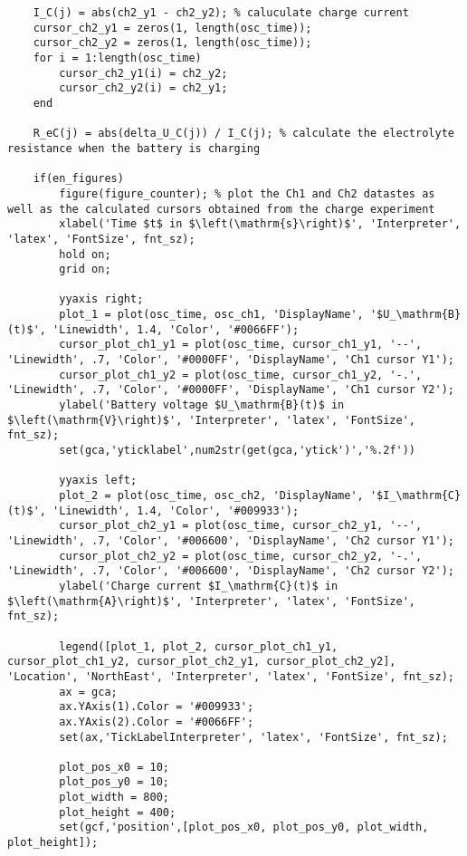 \begin{lstlisting}
    I_C(j) = abs(ch2_y1 - ch2_y2); % caluculate charge current
    cursor_ch2_y1 = zeros(1, length(osc_time));
    cursor_ch2_y2 = zeros(1, length(osc_time));
    for i = 1:length(osc_time)
        cursor_ch2_y1(i) = ch2_y2;
        cursor_ch2_y2(i) = ch2_y1;
    end

    R_eC(j) = abs(delta_U_C(j)) / I_C(j); % calculate the electrolyte resistance when the battery is charging
    
    if(en_figures)
        figure(figure_counter); % plot the Ch1 and Ch2 datastes as well as the calculated cursors obtained from the charge experiment
        xlabel('Time $t$ in $\left(\mathrm{s}\right)$', 'Interpreter', 'latex', 'FontSize', fnt_sz);
        hold on;
        grid on;
        
        yyaxis right;
        plot_1 = plot(osc_time, osc_ch1, 'DisplayName', '$U_\mathrm{B}(t)$', 'Linewidth', 1.4, 'Color', '#0066FF');
        cursor_plot_ch1_y1 = plot(osc_time, cursor_ch1_y1, '--', 'Linewidth', .7, 'Color', '#0000FF', 'DisplayName', 'Ch1 cursor Y1');
        cursor_plot_ch1_y2 = plot(osc_time, cursor_ch1_y2, '-.', 'Linewidth', .7, 'Color', '#0000FF', 'DisplayName', 'Ch1 cursor Y2');
        ylabel('Battery voltage $U_\mathrm{B}(t)$ in $\left(\mathrm{V}\right)$', 'Interpreter', 'latex', 'FontSize', fnt_sz);
        set(gca,'yticklabel',num2str(get(gca,'ytick')','%.2f'))
        
        yyaxis left;
        plot_2 = plot(osc_time, osc_ch2, 'DisplayName', '$I_\mathrm{C}(t)$', 'Linewidth', 1.4, 'Color', '#009933');
        cursor_plot_ch2_y1 = plot(osc_time, cursor_ch2_y1, '--', 'Linewidth', .7, 'Color', '#006600', 'DisplayName', 'Ch2 cursor Y1');
        cursor_plot_ch2_y2 = plot(osc_time, cursor_ch2_y2, '-.', 'Linewidth', .7, 'Color', '#006600', 'DisplayName', 'Ch2 cursor Y2');
        ylabel('Charge current $I_\mathrm{C}(t)$ in $\left(\mathrm{A}\right)$', 'Interpreter', 'latex', 'FontSize', fnt_sz);
        
        legend([plot_1, plot_2, cursor_plot_ch1_y1, cursor_plot_ch1_y2, cursor_plot_ch2_y1, cursor_plot_ch2_y2], 'Location', 'NorthEast', 'Interpreter', 'latex', 'FontSize', fnt_sz);
        ax = gca;
        ax.YAxis(1).Color = '#009933';
        ax.YAxis(2).Color = '#0066FF';
        set(ax,'TickLabelInterpreter', 'latex', 'FontSize', fnt_sz);
        
        plot_pos_x0 = 10;
        plot_pos_y0 = 10;
        plot_width = 800;
        plot_height = 400;
        set(gcf,'position',[plot_pos_x0, plot_pos_y0, plot_width, plot_height]);
        

\end{lstlisting}
